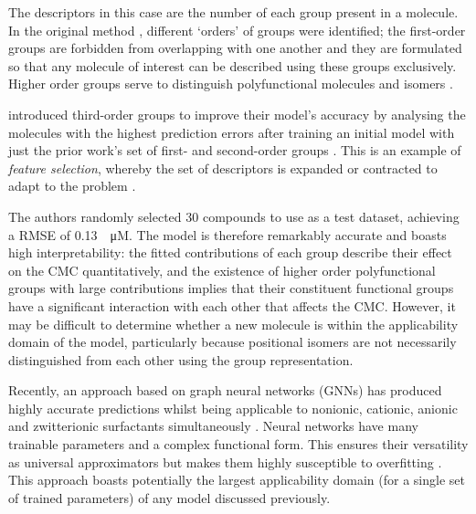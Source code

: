 The descriptors in this case are the number of each group present in a molecule.
In the original method \cite{ganiAutomaticCreationMissing2005}, different
`orders' of groups were identified; the first-order groups are forbidden from
overlapping with one another and they are formulated so that any molecule of
interest can be described using these groups exclusively. Higher order groups
serve to distinguish polyfunctional molecules and isomers
\cite{ganiAutomaticCreationMissing2005}.

\citet{matteiModelingCriticalMicelle2013} introduced third-order groups to
improve their model's accuracy by analysing the molecules with the highest
prediction errors after training an initial model with just the prior work's set
of first- and second-order groups \cite{ganiAutomaticCreationMissing2005}. This
is an example of \emph{feature selection}, whereby the set of descriptors is
expanded or contracted to adapt to the problem
\cite{liFeatureSelectionData2017,guyonIntroductionVariableFeature2003}.

The authors randomly selected 30 compounds to use as a test dataset, achieving a
RMSE of \SI{0.13}{\log \micro M}. The model is therefore remarkably accurate and
boasts high interpretability: the fitted contributions of each group describe
their effect on the CMC quantitatively, and the existence of higher order
polyfunctional groups with large contributions implies that their constituent
functional groups have a significant interaction with each other that affects
the CMC. However, it may be difficult to determine whether a new molecule is
within the applicability domain of the model, particularly because positional
isomers are not necessarily distinguished from each other using the group
representation.

Recently, an approach based on graph neural networks (GNNs) has produced highly
accurate predictions whilst being applicable to nonionic, cationic, anionic and
zwitterionic surfactants simultaneously \cite{qinPredictingCriticalMicelle2021}.
Neural networks have many trainable parameters and a complex functional form.
This ensures their versatility as universal approximators but makes them highly
susceptible to overfitting \cite{bejaniSystematicReviewOverfitting2021}. This
approach boasts potentially the largest applicability domain (for a single set
of trained parameters) of any model discussed previously.

